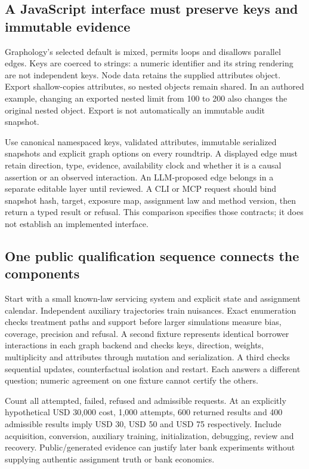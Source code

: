 \subsection{A JavaScript interface must preserve keys and immutable evidence}

Graphology's selected default is mixed, permits loops and disallows parallel
edges. Keys are coerced to strings: a numeric identifier and its string
rendering are not independent keys. Node data retains the supplied attributes
object. Export shallow-copies attributes, so nested objects remain shared.
In an authored example, changing an exported nested limit from 100 to 200 also
changes the original nested object. Export is not automatically an immutable
audit snapshot.~\citep{exec25_onet_graphology,exec25_onet_choice}

Use canonical namespaced keys, validated attributes, immutable serialized
snapshots and explicit graph options on every roundtrip. A displayed edge
must retain direction, type, evidence, availability clock and whether it is
a causal assertion or an observed interaction. An LLM-proposed edge belongs
in a separate editable layer until reviewed. A CLI or MCP request should bind
snapshot hash, target, exposure map, assignment law and method version, then
return a typed result or refusal. This comparison specifies those contracts;
it does not establish an implemented interface.
\citep{exec25_onet_graphology,exec25_onet_choice}

\subsection{One public qualification sequence connects the components}

Start with a small known-law servicing system and explicit state and assignment
calendar. Independent auxiliary trajectories train nuisances. Exact enumeration
checks treatment paths and support before larger simulations measure bias,
coverage, precision and refusal. A second fixture represents identical borrower
interactions in each graph backend and checks keys, direction, weights,
multiplicity and attributes through mutation and serialization. A third checks
sequential updates, counterfactual isolation and restart. Each answers a
different question; numeric agreement on one fixture cannot certify the others.
\citep{exec25_onet_choice}

Count all attempted, failed, refused and admissible requests. At an explicitly
hypothetical USD 30,000 cost, 1,000 attempts, 600 returned results and 400
admissible results imply USD 30, USD 50 and USD 75 respectively. Include acquisition,
conversion, auxiliary training, initialization, debugging, review and recovery.
Public/generated evidence can justify later bank experiments without supplying
authentic assignment truth or bank economics.~\citep{exec25_onet_choice}

